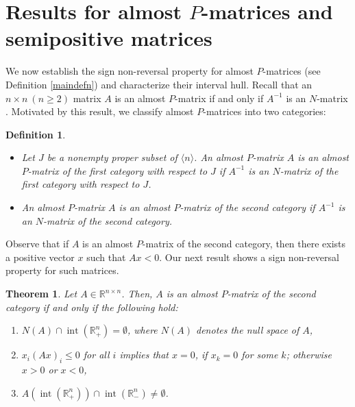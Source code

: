 \documentclass[11pt]{article}
\newtheorem{theorem}{Theorem}[section]
\newtheorem{defn}{Definition}[section]
\DeclareMathOperator{\inte }{int}
\begin{document}
\section{Results for almost $P$-matrices and semipositive matrices}\label{sec-alm-p-mat}

We now establish the sign non-reversal property for almost $P$-matrices
(see Definition \ref{maindefn}) and characterize their interval hull.
Recall that an $n \times n ~(n\geq 2)$ matrix $A$ is an almost $P$-matrix
if and only if $A^{-1}$ is an $N$-matrix \cite[Lemma 2.4]{koji-sai-1979}.
Motivated by this result, we classify almost $P$-matrices into two categories:
\begin{defn}\label{defnalmost p}
	\begin{itemize}
		\item[(i)] Let $J$  be a nonempty proper subset of $ \langle n \rangle$. An almost $P$-matrix $A$ is \emph{an almost $P$-matrix of the first category with respect to $J$} if $A^{-1}$ is an $N$-matrix of the first category with respect to $J$.
		\item[(ii)] An almost $P$-matrix $A$ is an \emph{almost $P$-matrix of the second category} if $A^{-1}$ is an $N$-matrix of the second category.
	\end{itemize}
\end{defn}
Observe that if $A$ is an almost $P$-matrix of the second category, then there exists a
positive vector $x$ such that $Ax<0$. Our next result shows a sign
non-reversal property for such matrices.

\begin{theorem}\label{alm-p-sec}
    Let $A \in \mathbb{R}^{n \times n}$. Then, $A$ is an almost $P$-matrix of the second category if and only if the following hold:

    \begin{enumerate}
     \item[(a)] $N(A) \cap  \inte (\mathbb{R}_+^n) = \emptyset$, where
 $N(A)$  denotes the null space of $A$,
     \item[(b)] $x_i(Ax)_i \leq 0$ for all $i$ implies that $x =0$, if  $x_k =0$ for some $k$; otherwise $x > 0 $ or $x <0$,
     \item[(c)] $A (\inte (\mathbb{R}_+^n)) \cap \inte (\mathbb{R}_-^n) \neq \emptyset$.
    \end{enumerate}
\end{theorem}
\end{document}
